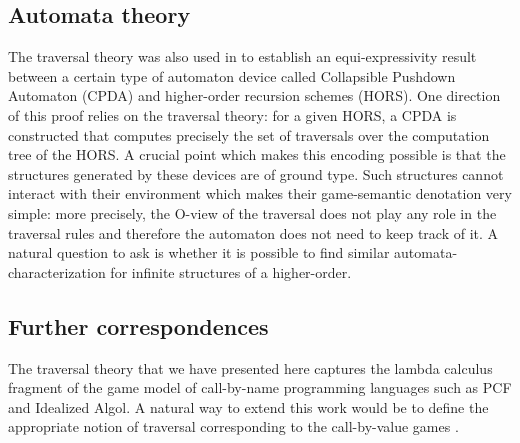 \subsection{Automata theory} The traversal theory was also used in \cite{hmos-lics08} to establish an equi-expressivity result between a certain type of automaton device called Collapsible Pushdown Automaton (CPDA) and higher-order recursion schemes (HORS).
One direction of this proof relies on the traversal theory: for a given HORS, a CPDA is constructed that computes precisely the set of traversals over the computation tree of the HORS.
A crucial point which makes this encoding possible is that the structures generated by these devices are of ground type. Such structures cannot interact with their environment which makes their game-semantic denotation very simple: more precisely, the O-view of the traversal does not play any role in the traversal rules and therefore the automaton does not need to keep track of it. A natural question to ask is whether it is possible to find similar automata-characterization for infinite structures of a higher-order.

\subsection{Further correspondences}
The traversal theory that we have presented here captures the lambda calculus fragment of the game model of call-by-name programming languages such as PCF and Idealized Algol. A natural way to extend this work would be to define the appropriate notion of traversal
corresponding to the call-by-value games \cite{plotkin-75, abramsky98callbyvalue}.
